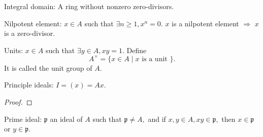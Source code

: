 Integral domain: A ring without nonzero zero-divisors.

Nilpotent element: $x\in A$ such that $\exists n\geqslant 1,x^n=0.$
$x$ is a nilpotent element $\Longrightarrow$ $x$ is a zero-divisor.

Units: $x\in A$ such that $\exists y\in A, xy=1.$ Define
$$A^{\times}=\{x\in A\mid x\text{ is a unit }\}.$$ It is called the
unit group of $A.$

Principle ideals: $I=(x)=Ax.$
\begin{proof}

\end{proof}
Prime ideal: $\mathfrak{p}$ an ideal of $A$ such that
$\mathfrak{p}\neq A,$ and if $x,y\in A,xy\in\mathfrak{p},$ then
$x\in\mathfrak{p}$ or $y\in\mathfrak{p}.$

